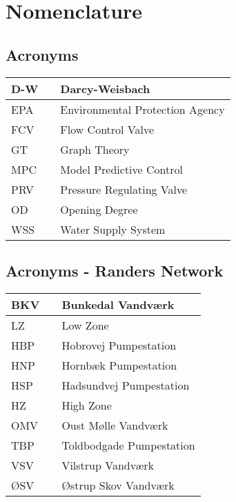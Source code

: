 \chapter{Nomenclature}

\section*{Acronyms}
	
	\begin{tabular}{|l c l|} \hline
		D-W     &&	Darcy-Weisbach									\\ \hline
		EPA     &&	Environmental Protection Agency					\\ \hline
		FCV     &&	Flow Control Valve								\\ \hline
		GT      &&	Graph Theory									\\ \hline
		MPC 	&&	Model Predictive Control						\\ \hline		
		PRV     &&	Pressure Regulating Valve						\\ \hline
		OD		&&	Opening Degree									\\ \hline
		WSS 	&&	Water Supply System								\\ \hline
	\end{tabular}

\section*{Acronyms - Randers Network}
	
	\begin{tabular}{|l c l|} \hline
		BKV     &&	Bunkedal Vandværk 					\\ \hline
		LZ      &&	Low Zone												\\ \hline
		HBP     &&	Hobrovej Pumpestation 		\\ \hline
		HNP     &&	Hornbæk Pumpestation 			\\ \hline
		HSP 	&&	Hadsundvej Pumpestation 	\\ \hline		
		HZ      &&	High Zone												\\ \hline
		OMV		&&	Oust Mølle Vandværk 				\\ \hline
		TBP 	&&	Toldbodgade Pumpestation 	\\ \hline
		VSV 	&&	Vilstrup Vandværk 					\\ \hline
		ØSV 	&&	Østrup Skov Vandværk 			\\ \hline
	\end{tabular}

\newpage

